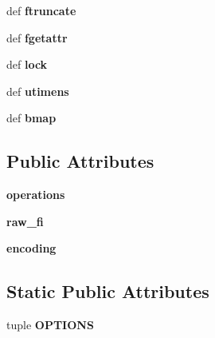\begin{DoxyCompactItemize}
\item 
\hypertarget{classfuse_1_1FUSE_adfae0cb5b12335df749f02f14a6c5930}{def {\bfseries ftruncate}}\label{classfuse_1_1FUSE_adfae0cb5b12335df749f02f14a6c5930}

\item 
\hypertarget{classfuse_1_1FUSE_a3b6ec70edf28f6682f3b1324589c3612}{def {\bfseries fgetattr}}\label{classfuse_1_1FUSE_a3b6ec70edf28f6682f3b1324589c3612}

\item 
\hypertarget{classfuse_1_1FUSE_a0828cb4b7539b16942936d51eac49929}{def {\bfseries lock}}\label{classfuse_1_1FUSE_a0828cb4b7539b16942936d51eac49929}

\item 
\hypertarget{classfuse_1_1FUSE_a2214871283a2e4d8e180cdb080d01435}{def {\bfseries utimens}}\label{classfuse_1_1FUSE_a2214871283a2e4d8e180cdb080d01435}

\item 
\hypertarget{classfuse_1_1FUSE_a06d8b61cb82af7a4b4a1d613ff92b244}{def {\bfseries bmap}}\label{classfuse_1_1FUSE_a06d8b61cb82af7a4b4a1d613ff92b244}

\end{DoxyCompactItemize}
\subsection*{Public Attributes}
\begin{DoxyCompactItemize}
\item 
\hypertarget{classfuse_1_1FUSE_a161d08b070f75f39880d8a8a3ed24e41}{{\bfseries operations}}\label{classfuse_1_1FUSE_a161d08b070f75f39880d8a8a3ed24e41}

\item 
\hypertarget{classfuse_1_1FUSE_a5eca88eb72361b4b875a4901ca6e6947}{{\bfseries raw\-\_\-fi}}\label{classfuse_1_1FUSE_a5eca88eb72361b4b875a4901ca6e6947}

\item 
\hypertarget{classfuse_1_1FUSE_aa477a64f892f8524f2d3bebe37d63727}{{\bfseries encoding}}\label{classfuse_1_1FUSE_aa477a64f892f8524f2d3bebe37d63727}

\end{DoxyCompactItemize}
\subsection*{Static Public Attributes}
\begin{DoxyCompactItemize}
\item 
tuple {\bfseries O\-P\-T\-I\-O\-N\-S}
\end{DoxyCompactItemize}



